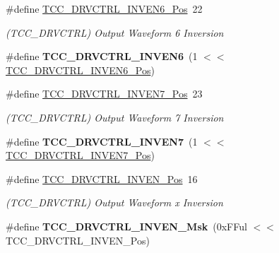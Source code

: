 \begin{DoxyCompactItemize}
\item 
\hypertarget{group___s_a_m_l21___t_c_c_gab0746e2d770f52bd460a119a77f2e0d0}{}\#define \hyperlink{group___s_a_m_l21___t_c_c_gab0746e2d770f52bd460a119a77f2e0d0}{T\+C\+C\+\_\+\+D\+R\+V\+C\+T\+R\+L\+\_\+\+I\+N\+V\+E\+N6\+\_\+\+Pos}~22\label{group___s_a_m_l21___t_c_c_gab0746e2d770f52bd460a119a77f2e0d0}

\begin{DoxyCompactList}\small\item\em (T\+C\+C\+\_\+\+D\+R\+V\+C\+T\+R\+L) Output Waveform 6 Inversion \end{DoxyCompactList}\item 
\hypertarget{group___s_a_m_l21___t_c_c_gace0e50addcd9ac00aebb8759bef8eeeb}{}\#define {\bfseries T\+C\+C\+\_\+\+D\+R\+V\+C\+T\+R\+L\+\_\+\+I\+N\+V\+E\+N6}~(1 $<$$<$ \hyperlink{group___s_a_m_l21___t_c_c_gab0746e2d770f52bd460a119a77f2e0d0}{T\+C\+C\+\_\+\+D\+R\+V\+C\+T\+R\+L\+\_\+\+I\+N\+V\+E\+N6\+\_\+\+Pos})\label{group___s_a_m_l21___t_c_c_gace0e50addcd9ac00aebb8759bef8eeeb}

\item 
\hypertarget{group___s_a_m_l21___t_c_c_gaf53626a2cabfa020fda075e33a74476e}{}\#define \hyperlink{group___s_a_m_l21___t_c_c_gaf53626a2cabfa020fda075e33a74476e}{T\+C\+C\+\_\+\+D\+R\+V\+C\+T\+R\+L\+\_\+\+I\+N\+V\+E\+N7\+\_\+\+Pos}~23\label{group___s_a_m_l21___t_c_c_gaf53626a2cabfa020fda075e33a74476e}

\begin{DoxyCompactList}\small\item\em (T\+C\+C\+\_\+\+D\+R\+V\+C\+T\+R\+L) Output Waveform 7 Inversion \end{DoxyCompactList}\item 
\hypertarget{group___s_a_m_l21___t_c_c_gac8f4844e62492c294c476c736e70217b}{}\#define {\bfseries T\+C\+C\+\_\+\+D\+R\+V\+C\+T\+R\+L\+\_\+\+I\+N\+V\+E\+N7}~(1 $<$$<$ \hyperlink{group___s_a_m_l21___t_c_c_gaf53626a2cabfa020fda075e33a74476e}{T\+C\+C\+\_\+\+D\+R\+V\+C\+T\+R\+L\+\_\+\+I\+N\+V\+E\+N7\+\_\+\+Pos})\label{group___s_a_m_l21___t_c_c_gac8f4844e62492c294c476c736e70217b}

\item 
\hypertarget{group___s_a_m_l21___t_c_c_gac328a23aafdc17cb86096f994378a4c6}{}\#define \hyperlink{group___s_a_m_l21___t_c_c_gac328a23aafdc17cb86096f994378a4c6}{T\+C\+C\+\_\+\+D\+R\+V\+C\+T\+R\+L\+\_\+\+I\+N\+V\+E\+N\+\_\+\+Pos}~16\label{group___s_a_m_l21___t_c_c_gac328a23aafdc17cb86096f994378a4c6}

\begin{DoxyCompactList}\small\item\em (T\+C\+C\+\_\+\+D\+R\+V\+C\+T\+R\+L) Output Waveform x Inversion \end{DoxyCompactList}\item 
\hypertarget{group___s_a_m_l21___t_c_c_ga6d25ebd326ac53edbea4d6f3244dc7a6}{}\#define {\bfseries T\+C\+C\+\_\+\+D\+R\+V\+C\+T\+R\+L\+\_\+\+I\+N\+V\+E\+N\+\_\+\+Msk}~(0x\+F\+Ful $<$$<$ T\+C\+C\+\_\+\+D\+R\+V\+C\+T\+R\+L\+\_\+\+I\+N\+V\+E\+N\+\_\+\+Pos)\label{group___s_a_m_l21___t_c_c_ga6d25ebd326ac53edbea4d6f3244dc7a6}


\end{DoxyCompactItemize}
